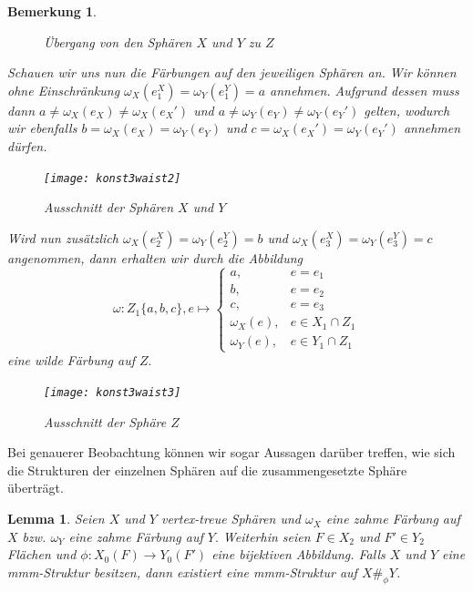 \documentclass[12pt,titlepage,twoside,cleardoublepage]{article}
\theoremstyle{nummermitklammern}
\newtheorem{lemma}[temp]{Lemma}
\newtheorem{bemerkung}[temp]{Bemerkung}
\newtheorem{lemma}[zahl]{Lemma}
\newtheorem{bemerkung}[zahl]{Bemerkung}
\numberwithin{equation}{section}
\begin{document}
\begin{bemerkung}
\begin{figure}[H]
\caption{Übergang von den Sphären $X$ und $Y$ zu $Z$}
\end{figure}   
Schauen wir uns nun die Färbungen auf den jeweiligen Sphären an. Wir können ohne Einschränkung $\omega_X(e_1^X)=\omega_Y(e_1^Y)=a$ annehmen. Aufgrund dessen muss dann $
a\neq \omega_X(e_X) \neq\omega_X(e_X')$
und $
a\neq \omega_Y(e_Y) \neq\omega_Y(e_Y')$
gelten, wodurch wir ebenfalls $
b= \omega_X(e_X) =\omega_Y(e_Y)$ und $
c= \omega_X(e_X') =\omega_Y(e_Y')$ annehmen dürfen.
\begin{figure}[H]
\begin{center}
\texttt{[image: konst3waist2]}
\end{center}
\caption{Ausschnitt der Sphären $X$ und $Y$}
\end{figure}
Wird nun zusätzlich $\omega_X(e_2^X)=\omega_Y(e_2^Y)=b$ und $\omega_X(e_3^X)=\omega_Y(e_3^Y)=c$ angenommen, dann erhalten wir durch die Abbildung 
\[
\omega: Z_1 \{a,b,c\},e\mapsto
 \begin{cases}
 a, &e=e_1\\
 b,& e=e_2 \\
 c, & e=e_3\\
 \omega_X(e), &e \in X_1\cap Z_1\\
 \omega_Y(e), & e\in Y_1 \cap Z_1
 \end{cases}
\]
eine wilde Färbung auf $Z.$
\begin{figure}[H]
\begin{center}
\texttt{[image: konst3waist3]}
\end{center}
\caption{Ausschnitt der Sphäre $Z$}
\end{figure}
\end{bemerkung}
Bei genauerer Beobachtung können wir sogar Aussagen darüber treffen, wie sich die Strukturen der einzelnen Sphären auf die zusammengesetzte Sphäre überträgt.
\begin{lemma}
Seien $X$ und $Y$ vertex-treue Sphären und $\omega_X$ eine zahme Färbung auf $X$ bzw. $\omega_Y$ eine zahme Färbung auf $Y.$ Weiterhin seien $F\in X_2$ und $F'\in Y_2$ Flächen und $\phi:X_0(F)\to Y_0(F')$ eine bijektiven Abbildung. 
Falls $X$ und $Y$ eine mmm-Struktur besitzen, dann existiert eine mmm-Struktur auf $X\#_{\phi}Y$.
\end{lemma}
\end{document}
